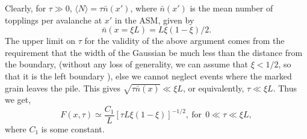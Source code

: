 \documentclass[11pt,a4paper]{book}
\begin{document}
Clearly, for $\tau \gg 0$,  $\langle N \rangle = \tau 
\bar{n}(x')$, where $\bar{n}(x')$ is the mean number of topplings per 
avalanche at $x'$ in the ASM,  given by
\begin{equation}
\bar{n}(x = \xi L)= L \xi  (1 - \xi)/2.
\end{equation}
The upper limit on $\tau$  for the validity of the above argument 
comes from the 
requirement that the width of the Gaussian be much less than the 
distance from the boundary, (without any loss of generality, we can assume 
that $\xi < 1/2$, so that it is the left boundary ), else we cannot neglect 
events where the marked grain 
leaves the pile. This gives  
$\sqrt{\tau \bar{n}(x)} \ll \xi L$, or equivalently, $\tau \ll \xi L. $
Thus we get,
\begin{equation}
  F(x,\tau) \simeq \frac{C_1}{L} [ \tau L \xi (1 -\xi)]^{-1/2}, \mathrm{~ for~~} 0 \ll \tau 
\ll \xi L,
\end{equation}
where $C_1$ is some constant.
\end{document}
